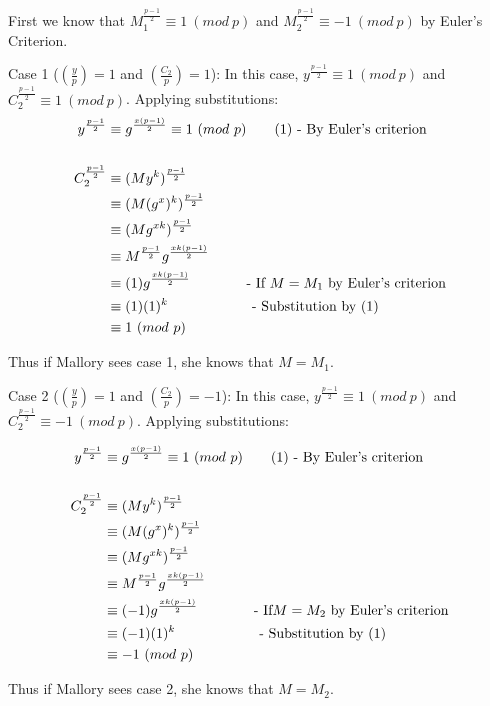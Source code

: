 \documentclass[11pt]{article}
\theoremstyle{definition}
\providecommand{\Leg}[2]{\genfrac{(}{)}{}{}{#1}{#2}}
\begin{document}
\begin{enumerate}
First we know that $M_1^{\frac{p-1}{2}} \equiv 1\ (mod\ p)$ and $M_2^{\frac{p-1}{2}} \equiv -1\ (mod\ p)$ by Euler’s Criterion. 

Case 1 ($\Leg{y}{p} = 1$ and $\Leg{C_2}{p} = 1$):
In this case, $y^{\frac{p-1}{2}} \equiv 1\ (mod\ p)$ and $C_2^{\frac{p-1}{2}} \equiv 1\ (mod\ p)$. Applying substitutions:
\begin{align*}
y^{\frac{p-1}{2}} &\equiv g^{\frac{x(p-1)}{2}} \equiv 1\ (mod\ p)			\text{\qquad(1) - By Euler’s criterion} \\
&\\
C_2^{\frac{p-1}{2}} &\equiv (My^k)^{\frac{p-1}{2}} \\
&\equiv (M(g^x)^k)^{\frac{p-1}{2}} \\
&\equiv (Mg^{xk})^{\frac{p-1}{2}} \\
&\equiv M^{\frac{p-1}{2}}g^{\frac{xk(p-1)}{2}} \\
&\equiv (1)g^{\frac{xk(p-1)}{2}}								\text{\qquad\qquad- If $M = M_1$ by Euler’s criterion} \\
&\equiv (1)(1)^k											\text{\qquad\qquad\qquad- Substitution by (1)} \\
&\equiv 1\ (mod\ p)
\end{align*}

Thus if Mallory sees case 1, she knows that $M = M_1$. 

Case 2 ($\Leg{y}{p} = 1$ and $\Leg{C_2}{p} = -1$):
In this case, $y^{\frac{p-1}{2}} \equiv 1\ (mod\ p)$ and $C_2^{\frac{p-1}{2}} \equiv -1\ (mod\ p)$. Applying substitutions:

\begin{align*}
y^{\frac{p-1}{2}} &\equiv g^{\frac{x(p-1)}{2}} \equiv 1\ (mod\ p)			\text{\qquad(1) - By Euler’s criterion} \\
&\\
C_2^{\frac{p-1}{2}} &\equiv (My^k)^{\frac{p-1}{2}} \\
&\equiv (M(g^x)^k)^{\frac{p-1}{2}} \\
&\equiv (Mg^{xk})^{\frac{p-1}{2}} \\
&\equiv M^{\frac{p-1}{2}}g^{\frac{xk(p-1)}{2}} \\
&\equiv (-1)g^{\frac{xk(p-1)}{2}}								\text{\qquad\qquad- If$M = M_2$ by Euler’s criterion} \\
&\equiv (-1)(1)^k											\text{\qquad\qquad\qquad- Substitution by (1)} \\
&\equiv -1\ (mod\ p)
\end{align*}
	
Thus if Mallory sees case 2, she knows that $M = M_2$. 


\end{enumerate}
\end{document}
